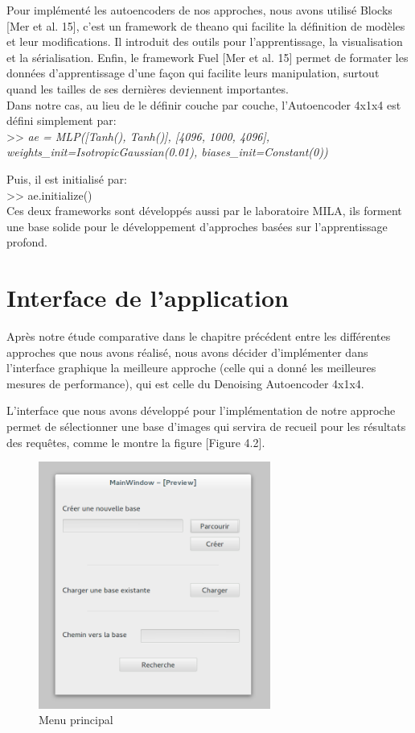 	Pour implémenté les autoencoders de nos approches, nous avons utilisé Blocks [Mer et al. 15], c'est un framework de theano qui facilite la définition de modèles et leur modifications. Il introduit des outils pour l'apprentissage, la visualisation et la sérialisation. Enfin, le framework Fuel [Mer et al. 15] permet de formater les données d'apprentissage d'une façon qui facilite leurs manipulation, surtout quand les tailles de ses dernières deviennent importantes.\\

	Dans notre cas, au lieu de le définir couche par couche, l'Autoencoder 4x1x4 est défini simplement par:\\

>> \textit{ae = MLP([Tanh(), Tanh()], [4096, 1000, 4096],
              weights\_init=IsotropicGaussian(0.01),
              biases\_init=Constant(0))\\
   }           

Puis, il est initialisé par:\\

>> ae.initialize()\\

	Ces deux frameworks sont développés aussi par le laboratoire MILA, ils forment une base solide pour le développement d’approches basées sur l'apprentissage profond.

\section{Interface de l'application}

	Après notre étude comparative dans le chapitre précédent entre les différentes approches que nous avons réalisé, nous avons décider d'implémenter dans l'interface graphique la meilleure approche (celle qui a donné les meilleures mesures de performance), qui est celle du Denoising Autoencoder 4x1x4.

	L'interface que nous avons développé pour l'implémentation de notre approche permet de sélectionner une base d'images qui servira de recueil pour les résultats des requêtes, comme le montre la figure [Figure 4.2].


\begin{figure}[H]
	\centering
		\includegraphics[width=3in]{Figures/mainMenu.png}
	\caption[Menu principal]{Menu principal}
	\label{fig:Electron}
\end{figure}

